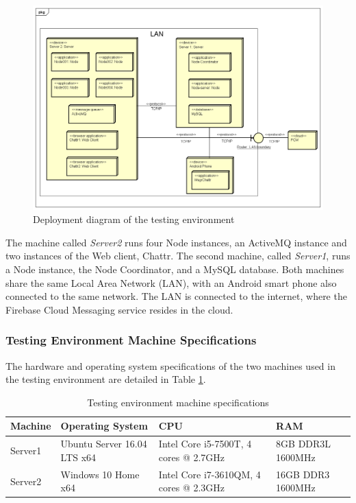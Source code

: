 \begin{figure}[!ht]
	\centering
	\includegraphics[width=1\textwidth]{figures/05_testing/test-deploy-dia}
    \caption{Deployment diagram of the testing environment}
    \label{fig:test-deploy-dia}
\end{figure}

The machine called \textit{Server2} runs four Node instances, an ActiveMQ instance and two instances of the Web client, Chattr. The second machine, called \textit{Server1}, runs a Node instance, the Node Coordinator, and a MySQL database. Both machines share the same Local Area Network (LAN), with an Android smart phone also connected to the same network. The LAN is connected to the internet, where the Firebase Cloud Messaging service resides in the cloud.

\subsubsection{Testing Environment Machine Specifications}
The hardware and operating system specifications of the two machines used in the testing environment are detailed in Table \ref{tab:test-hw}.

\begin{table}[!ht]
\begin{center}
\begin{tabularx}{\textwidth}{l|X|X|l}
\hline
\textbf{Machine} & \textbf{Operating System} & \textbf{CPU} & \textbf{RAM} \\
\hline
Server1 & Ubuntu Server 16.04 LTS x64 & Intel Core i5-7500T, 4 cores @ 2.7GHz & 8GB DDR3L 1600MHz \\
\hline
Server2 & Windows 10 Home x64 & Intel Core i7-3610QM, 4 cores @ 2.3GHz & 16GB DDR3 1600MHz \\
\hline
\end{tabularx}
\end{center}
\caption{Testing environment machine specifications}
\label{tab:test-hw}
\end{table}

